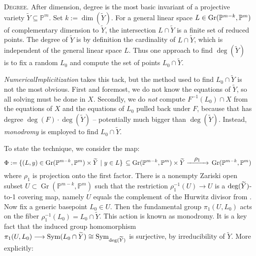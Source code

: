 \documentclass[letter]{amsart}
\theoremstyle{definition}
\begin{document}
\noindent
\textsc{Degree.}
After dimension, degree is the most basic invariant of a projective variety $\widetilde{Y} \subseteq {\mathbb{P}}^m$.
Set $k := \dim(\widetilde{Y})$. For a general linear space $ L \in \textup{Gr}({\mathbb{P}}^{m-k}, {\mathbb{P}}^{m})$ of complementary dimension to $\widetilde{Y}$,
the intersection $L \cap \widetilde{Y}$ is a finite set of reduced points. The degree of $\widetilde{Y}$ is by definition the cardinality of $L \cap \widetilde{Y}$, which is independent of the general linear space $L$. Thus one approach to find $\deg(\widetilde{Y})$ is to fix a random $L_0$ and compute the set of points $L_0 \cap \widetilde{Y}$.

\textit{NumericalImplicitization} takes this tack, but the method used to find $L_0 \cap \widetilde{Y}$ is not the most obvious. First and foremost, we do not know the equations of $\widetilde{Y}$, so all solving must be done in $X$.
Secondly, we do \textit{not} compute $F^{-1}(L_0) \cap X$ from the equations of $X$ and the equations of $L_0$ pulled back under $F$, 
because that has degree $\deg(F) \cdot \deg(\widetilde{Y})$ -- potentially much bigger than $\deg(\widetilde{Y})$.
Instead, \textit{monodromy} is employed to find $L_0 \cap \widetilde{Y}$.

To state the technique, 
we consider the map:
$$ \Phi := \{ (L, y) \in \operatorname{Gr}({\mathbb{P}}^{m-k}, {\mathbb{P}}^{m}) \times \widetilde{Y} \,\, | \,\, y \in L\} \, \subseteq \operatorname{Gr}({\mathbb{P}}^{m-k}, {\mathbb{P}}^{m}) \times \widetilde{Y} \xrightarrow{\makebox[1cm]{$\rho_1$}} \, \operatorname{Gr}({\mathbb{P}}^{m-k}, {\mathbb{P}}^{m})$$
where $\rho_{1}$ is projection onto the first factor.  There is a nonempty Zariski open subset $U \subset \operatorname{Gr}({\mathbb{P}}^{m-k}, {\mathbb{P}}^{m})$ such that the restriction $\rho_{1}^{-1}(U) \rightarrow U$ is a $\textup{deg}(\widetilde{Y})$-to-1
covering map, namely $U$ equals the complement of the Hurwitz divisor from \cite{St}.  Now fix a generic basepoint $L_{0} \in U$.
Then the fundamental group $\pi_{1}(U, L_{0})$ acts on the fiber $\rho_{1}^{-1}(L_{0}) = L_{0} \cap \widetilde{Y}$. 
This action is known as monodromy.  It is a key fact that the induced group homomorphism $\pi_{1}(U, L_{0}) \longrightarrow \textup{Sym}(L_{0} \cap \widetilde{Y}) \cong \textup{Sym}_{\deg(\widetilde{Y})}$ is surjective, by irreducibility of $\widetilde{Y}$. More explicitly:
\end{document}

